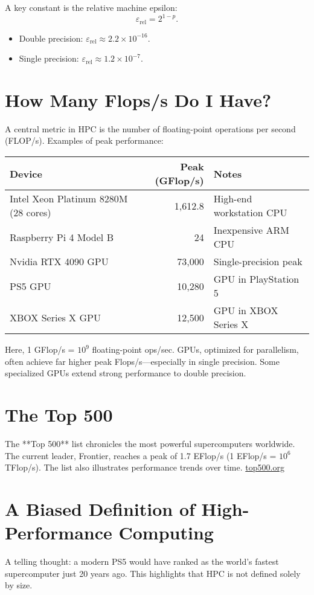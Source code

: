 \documentclass[11pt,a4paper]{book}
\begin{document}
A key constant is the relative machine epsilon:
\[
\varepsilon_{\text{rel}} = 2^{1-p}.
\]
\begin{itemize}
  \item Double precision: \(\varepsilon_{\text{rel}} \approx 2.2\times10^{-16}.\)
  \item Single precision: \(\varepsilon_{\text{rel}} \approx 1.2\times10^{-7}.\)
\end{itemize}

\section{How Many Flops/s Do I Have?}
A central metric in HPC is the number of floating-point operations per second (FLOP/s). Examples of peak performance:

\begin{tabular}{l r l}
\textbf{Device} & \textbf{Peak (GFlop/s)} & \textbf{Notes} \\ \hline
Intel Xeon Platinum 8280M (28 cores) & 1,612.8 & High-end workstation CPU \\
Raspberry Pi 4 Model B & 24 & Inexpensive ARM CPU \\
Nvidia RTX 4090 GPU & 73,000 & Single-precision peak \\
PS5 GPU & 10,280 & GPU in PlayStation 5 \\
XBOX Series X GPU & 12,500 & GPU in XBOX Series X \\
\end{tabular}

Here, 1 GFlop/s = \(10^9\) floating-point ops/sec. GPUs, optimized for parallelism, often achieve far higher peak Flops/s—especially in single precision. Some specialized GPUs extend strong performance to double precision.

\section{The Top 500}
The **Top 500** list chronicles the most powerful supercomputers worldwide. The current leader, Frontier, reaches a peak of 1.7 EFlop/s (1 EFlop/s = \(10^6\) TFlop/s). The list also illustrates performance trends over time. \href{https://www.top500.org}{top500.org}

\section{A Biased Definition of High-Performance Computing}
A telling thought: a modern PS5 would have ranked as the world’s fastest supercomputer just 20 years ago. This highlights that HPC is not defined solely by size.
\end{document}
